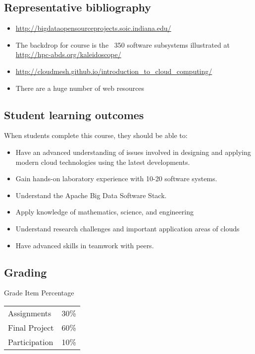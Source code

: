 \subsection{Representative bibliography}

\begin{itemize}
\item	\url{http://bigdataopensourceprojects.soic.indiana.edu/}
\item	The backdrop for course is the ~350 software subsystems illustrated at \url{http://hpc-abds.org/kaleidoscope/}
\item	\url{http://cloudmesh.github.io/introduction_to_cloud_computing/}
\item	There are a huge number of web resources
\end{itemize}

\subsection{Student learning outcomes}

When students complete this course, they should be able to:

\begin{itemize}
\item	Have an advanced understanding of issues involved in designing and applying modern cloud technologies using the latest developments.
\item	Gain hands-on laboratory experience with 10-20 software systems.
\item	Understand the Apache Big Data Software Stack.
\item	Apply knowledge of mathematics, science, and engineering
\item	Understand research challenges and important application areas of clouds
\item	Have advanced skills in teamwork with peers.
\end{itemize}

\subsection{Grading}

Grade Item	Percentage
\begin{tabular}{lr}
Assignments	  & 30\% \\
Final Project	& 60\% \\
Participation	& 10\% \\
\end{tabular}

